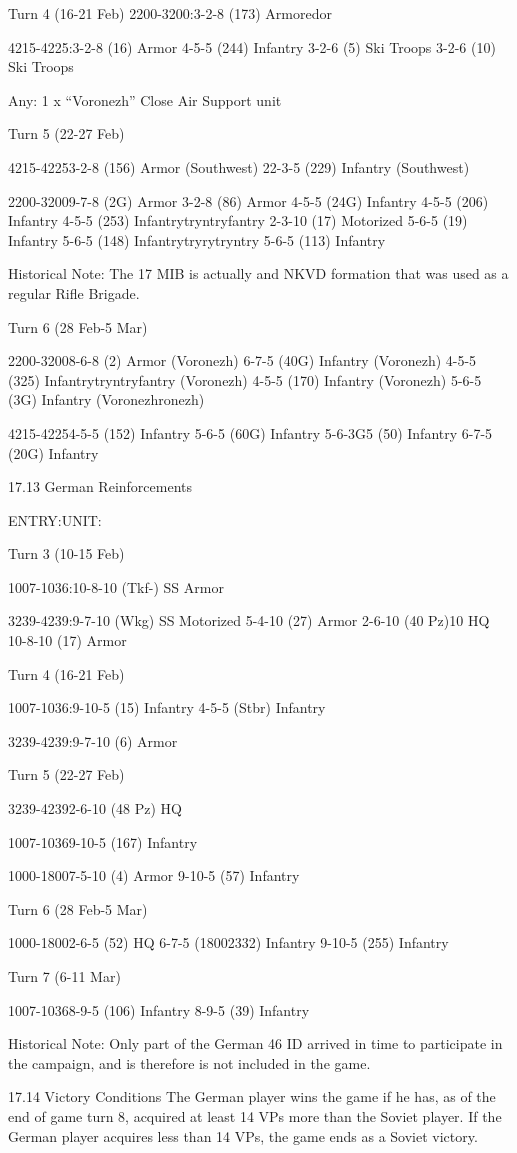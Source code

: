 \documentclass[10pt]{article}
\begin{document}
Turn 4 (16-21 Feb)
2200-3200:3-2-8 (173) Armoredor

4215-4225:3-2-8 (16) Armor
4-5-5 (244) Infantry
3-2-6 (5) Ski           Troops
3-2-6 (10) Ski Troops

Any: 1 x “Voronezh” Close Air Support unit

Turn 5 (22-27 Feb)

4215-42253-2-8 (156) Armor (Southwest)
22-3-5 (229) Infantry (Southwest)

2200-32009-7-8 (2G) Armor
3-2-8 (86) Armor
4-5-5 (24G) Infantry
4-5-5 (206) Infantry
4-5-5 (253) Infantrytryntryfantry
2-3-10 (17) Motorized
5-6-5 (19) Infantry
5-6-5 (148) Infantrytryrytryntry
5-6-5 (113) Infantry

Historical Note: The 17 MIB is actually and NKVD formation that was used as a regular Rifle Brigade.

Turn 6 (28 Feb-5 Mar)

2200-32008-6-8 (2) Armor (Voronezh)
6-7-5 (40G) Infantry (Voronezh)
4-5-5 (325) Infantrytryntryfantry (Voronezh)
4-5-5 (170) Infantry (Voronezh)
5-6-5 (3G) Infantry (Voronezhronezh)

4215-42254-5-5 (152) Infantry
5-6-5 (60G) Infantry
5-6-3G5 (50) Infantry
6-7-5 (20G) Infantry

17.13 German Reinforcements

        ENTRY:UNIT:

Turn 3 (10-15 Feb)

1007-1036:10-8-10 (Tkf-) SS Armor

      3239-4239:9-7-10 (Wkg) SS Motorized
5-4-10 (27) Armor
2-6-10 (40 Pz)10 HQ
10-8-10 (17) Armor

Turn 4 (16-21 Feb)

1007-1036:9-10-5 (15) Infantry
4-5-5 (Stbr) Infantry

3239-4239:9-7-10 (6) Armor

Turn 5 (22-27 Feb)

3239-42392-6-10 (48 Pz)     HQ

1007-10369-10-5 (167) Infantry

1000-18007-5-10 (4) Armor
9-10-5    (57) Infantry

Turn 6 (28 Feb-5 Mar)

1000-18002-6-5 (52) HQ
6-7-5 (18002332) Infantry
9-10-5 (255) Infantry

Turn 7 (6-11 Mar)

1007-10368-9-5 (106) Infantry
8-9-5 (39) Infantry

Historical Note: Only part of     the German 46 ID arrived in time to participate in the campaign, and is therefore is not included in the game.

17.14 Victory Conditions
The German player wins the game if he has, as of the end of game turn 8, acquired at least 14 VPs more than the Soviet player. If the German player acquires less than 14 VPs, the game ends as a Soviet victory.
\end{document}
